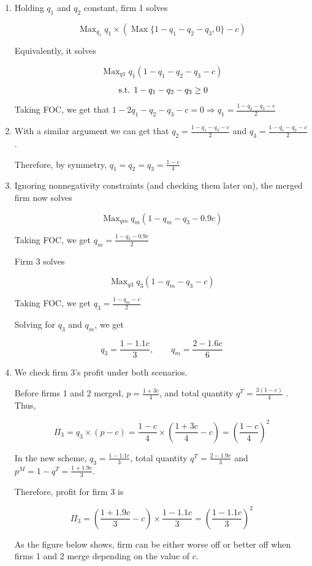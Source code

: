 \documentclass{article}
\DeclareMathOperator*{\Max}{Max}
\newcommand{\st}{\hbox{ s.t. }}
\newenvironment{solution}{\color{red}}{\color{black}}
\begin{document}
\begin{solution}

\begin{enumerate}
\item Holding $q_1$ and $q_2$ constant, firm 1 solves

\[ \Max_{q_1} q_1\times (\Max \{1 - q_1-q_2-q_3, 0\} -c) \]

Equivalently, it solves 

\[ \Max_{q1} q_1(1 - q_1-q_2-q_3-c) \]

\[ \st 1 - q_1-q_2-q_3 \geq 0 \]

Taking FOC, we get that $1-2q_1-q_2-q_3-c=0 \Rightarrow q_1=\frac{1-q_2-q_3-c}{2}$

\item With a similar argument we can get that $q_2=\frac{1-q_1-q_3-c}{2}$ and $q_3=\frac{1-q_1-q_2-c}{2}$.

Therefore, by symmetry, $q_1=q_2=q_3=\frac{1-c}{4}$

\item Ignoring nonnegativity constraints (and checking them later on), the merged firm now solves

\[ \Max_{qm} q_m(1 - q_m-q_3-0.9c) \]

Taking FOC, we get $q_m=\frac{1-q_3-0.9c}{2}$

Firm 3 solves 

\[ \Max_{q3} q_3(1 - q_m-q_3-c) \]

Taking FOC, we get $q_3=\frac{1-q_m-c}{2}$

Solving for $q_3$ and $q_m$, we get

\[ q_3=\frac{1-1.1c}{3}, \qquad q_m=\frac{2-1.6c}{6} \]

\item We check firm 3's profit under both scenarios.

Before firms 1 and 2 merged, $p=\frac{1+3c}{4}$, and total quantity $q^T=\frac{3(1-c)}{4}$ . Thus, 

\[ \Pi_3=q_3 \times (p-c)=\frac{1-c}{4} \times \left(  \frac{1+3c}{4}-c \right)= \left( \frac{1-c}{4} \right)^2 \]

In the new scheme, $q_3=\frac{1-1.1c}{3}$, total quantity $q^T=\frac{2-1.9c}{3}$ and $p^M=1-q^T=\frac{1+1.9c}{3}$.

Therefore, profit for firm 3 is 

\[ \Pi_3=\left( \frac{1+1.9c}{3} -c \right) \times \frac{1-1.1c}{3}=\left( \frac{1-1.1c}{3} \right)^2 \]

As the figure below shows, firm can be either worse off or better off when firms 1 and 2 merge depending on the value of $c$. 


\end{enumerate}
\end{solution}
\end{document}
